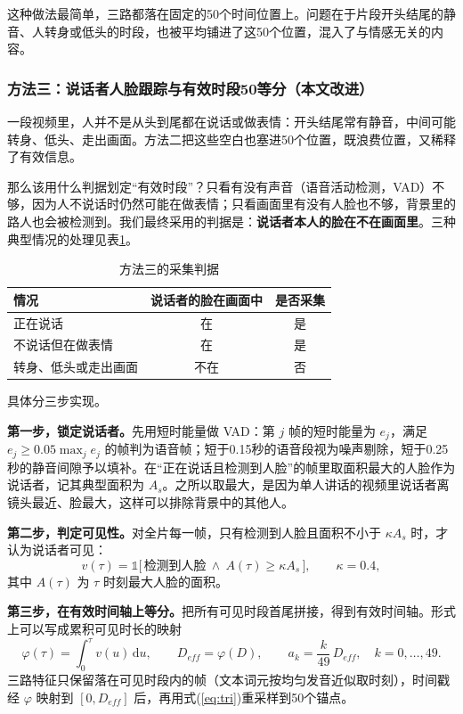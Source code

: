 这种做法最简单，三路都落在固定的50个时间位置上。问题在于片段开头结尾的静音、人转身或低头的时段，也被平均铺进了这50个位置，混入了与情感无关的内容。

\subsubsection{方法三：说话者人脸跟踪与有效时段50等分（本文改进）}\label{sec:m3}

一段视频里，人并不是从头到尾都在说话或做表情：开头结尾常有静音，中间可能转身、低头、走出画面。方法二把这些空白也塞进50个位置，既浪费位置，又稀释了有效信息。

那么该用什么判据划定“有效时段”？只看有没有声音（语音活动检测，VAD）不够，因为人不说话时仍然可能在做表情；只看画面里有没有人脸也不够，背景里的路人也会被检测到。我们最终采用的判据是：\textbf{说话者本人的脸在不在画面里}。三种典型情况的处理见表\ref{tab:m3rule}。

\begin{table}[htbp]
\centering
\caption{方法三的采集判据}
\label{tab:m3rule}
\begin{tabular}{lcc}
\toprule
情况 & 说话者的脸在画面中 & 是否采集 \\
\midrule
正在说话 & 在 & 是 \\
不说话但在做表情 & 在 & 是 \\
转身、低头或走出画面 & 不在 & 否 \\
\bottomrule
\end{tabular}
\end{table}

具体分三步实现。

\textbf{第一步，锁定说话者。}先用短时能量做 VAD：第 $j$ 帧的短时能量为 $e_j$，满足 $e_j\ge0.05\max_j e_j$ 的帧判为语音帧；短于0.15秒的语音段视为噪声剔除，短于0.25秒的静音间隙予以填补。在“正在说话且检测到人脸”的帧里取面积最大的人脸作为说话者，记其典型面积为 $A_s$。之所以取最大，是因为单人讲话的视频里说话者离镜头最近、脸最大，这样可以排除背景中的其他人。

\textbf{第二步，判定可见性。}对全片每一帧，只有检测到人脸且面积不小于 $\kappa A_s$ 时，才认为说话者可见：
\begin{equation}\label{eq:visible}
v(\tau)=\mathbb{1}\big[\,\text{检测到人脸}\ \wedge\ A(\tau)\ge\kappa A_s\,\big],\qquad \kappa=0.4,
\end{equation}
其中 $A(\tau)$ 为 $\tau$ 时刻最大人脸的面积。

\textbf{第三步，在有效时间轴上等分。}把所有可见时段首尾拼接，得到有效时间轴。形式上可以写成累积可见时长的映射
\begin{equation}\label{eq:effmap}
\varphi(\tau)=\int_0^{\tau}v(u)\,\mathrm{d}u,\qquad D_{eff}=\varphi(D),\qquad a_k=\frac{k}{49}\,D_{eff},\quad k=0,\dots,49.
\end{equation}
三路特征只保留落在可见时段内的帧（文本词元按均匀发音近似取时刻），时间戳经 $\varphi$ 映射到 $[0,D_{eff}]$ 后，再用式(\ref{eq:tri})重采样到50个锚点。

